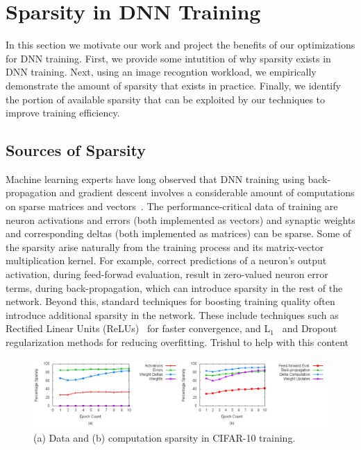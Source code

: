\section{Sparsity in DNN Training}
 \label{sec:sparse_dnn_training}
 
 In this section we motivate our work and project the benefits of our optimizations for DNN training.  First, we provide some intutition of why sparsity exists in DNN training.  Next, using an image recogntion workload, we empirically demonstrate the amount of sparsity that exists in practice.  Finally, we identify the portion of available sparsity that can be exploited by our techniques to improve training efficiency. 
 
\subsection{Sources of Sparsity}
\label{subsec:sparsity_source}

Machine learning experts have long observed that DNN training using back-propagation and gradient descent involves a considerable amount of computations on sparse matrices and vectors~\cite{Ng04, Nair10, Krizhevsky12, Bengio13, Srivastava14a}.  The performance-critical data of training are neuron activations and errors (both implemented as vectors) and synaptic weights and corresponding deltas (both implemented as matrices) can be sparse.  Some of the sparsity arise naturally from the training process and its matrix-vector multiplication kernel.  For example, correct predictions of a neuron's output activation, during feed-forwad evaluation, result in zero-valued neuron error terms, during back-propagation, which can introduce sparsity in the rest of the network.  Beyond this, standard techniques for boosting training quality often introduce additional sparsity in the network.  These include techniques such as Rectified Linear Units (ReLUs)~\cite{Nair10, Krizhevsky12} for faster convergence, and  L$_1$~\cite{Ng04, Bengio13} and Dropout~\cite{Srivastava14a} regularization methods for reducing overfitting.  {\color{red} Trishul to help with this content}
 
\begin{figure}
 \centering
 \includegraphics[width=1.9\columnwidth]{Figures/cifar-10_word_sparsity.png}
\caption{(a) Data and (b) computation sparsity in CIFAR-10 training.}
 \label{fig:cifar-10_word_sparsity}
 \end{figure}

